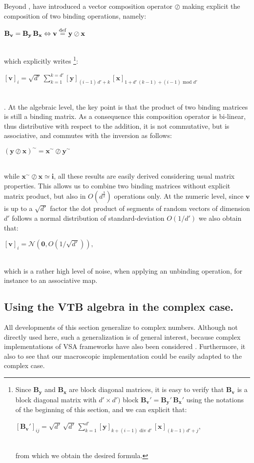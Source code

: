 \documentclass[sn-mathphys]{sn-jnl}
\newcommand{\defq}{\stackrel {\rm def}{=}}
\newcommand{\eqline}[1]{~\vspace{0.1cm}\\\centerline{$#1$}\vspace{0.1cm}\\}
\begin{document}
\begin{appendices}
Beyond \cite{gosmann_vector-derived_2019}, \cite{mercier_ontology_2021} have introduced a vector composition operator $\oslash$ making explicit the composition of two binding operations, namely:
\eqline{\mathbf{B_v} = \mathbf{B_y} \, \mathbf{B_x} \Leftrightarrow \mathbf{v} \defq \mathbf{y} \oslash \mathbf{x}}
which explicitly writes \footnote{Since $\mathbf{B_y}$ and $\mathbf{B_x}$ are block diagonal matrices, it is easy to verify that $\mathbf{B_v}$ is a block diagonal matrix with $d' \times d')$ block $\mathbf{B_v}' = \mathbf{B_y}' \, \mathbf{B_x}'$ using the notations of the beginning of this section, and we can explicit that:
\eqline{[\mathbf{B_v}']_{ij} = \sqrt{d'} \, \sqrt{d'} \, \sum_{k = 1}^{d'} [\mathbf{y}]_{k + (i - 1) \mbox{ div } d'} \, [\mathbf{x}]_{(k - 1) \, d' + j},}
from which we obtain the desired formula.}:
\eqline{[\mathbf{v}]_i = \sqrt{d'} \, \sum_{k = 1}^{k = d'} [\mathbf{y}]_{(i - 1) \, d' + k} \, [\mathbf{x}]_{1 + d' \, (k - 1) + (i - 1) \mbox{ mod } d'}}. At the algebraic level, the key point is that the product of two binding matrices is still a binding matrix. As a consequence this composition operator is bi-linear, thus distributive with respect to the addition, it is not commutative, but is associative, and commutes with the inversion as follows:
\eqline{(\mathbf{y} \oslash \mathbf{x})^\sim = \mathbf{x}^\sim \oslash \mathbf{y}^\sim}
while $\mathbf{x}^\sim \oslash \mathbf{x} \simeq \mathbf{\mathbf{i}}$, all these results are easily derived considering usual matrix properties. This allows us to combine two binding matrices without explicit matrix product, but also in $O\left(d^{\frac{3}{2}}\right)$ operations only. At the numeric level, since $\mathbf{v}$ is up to a $\sqrt{d'}$ factor the dot product of segments of random vectors of dimension $d'$ follows a normal distribution of standard-deviation $O(1/d')$ we also obtain that:
\eqline{[\mathbf{v}]_i = {\mathcal N}(\mathbf{0}, O(1/\sqrt{d'})),}
which is a rather high level of noise, when applying an unbinding operation, for instance to an associative map.

\subsection*{Using the VTB algebra in the complex case.}

All developments of this section generalize to complex numbers. Although not directly used here, such a generalization is of general interest, because complex implementations of VSA frameworks have also been considered \cite{schlegel_comparison_2020}. Furthermore, it also to see that our macroscopic implementation could be easily adapted to the complex case.


\end{appendices}
\end{document}
